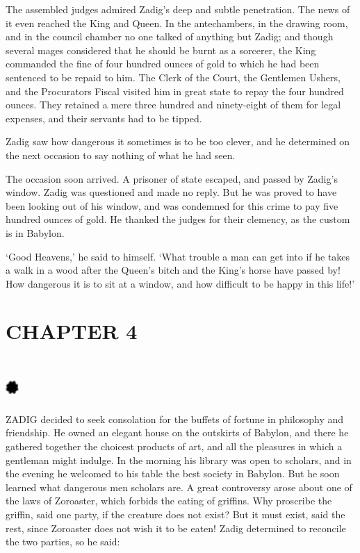 \documentclass{article}
\begin{document}
\begin{center}
The assembled judges admired Zadig's deep and subtle penetration. The news of it 
even reached the King and Queen. In the antechambers, in the drawing room, and 
in the council chamber no one talked of anything but Zadig; and though several 
mages considered that he should be burnt as a sorcerer, the King commanded the 
fine of four hundred ounces of gold to which he had been sentenced to be repaid 
to him. The Clerk of the Court, the Gentlemen Ushers, and the Procurators Fiscal 
visited him in great state to repay the four hundred ounces. They retained a mere 
three hundred and ninety-eight of them for legal expenses, and their servants had 
to be tipped. 

Zadig saw how dangerous it sometimes is to be too clever, and he determined on 
the next occasion to say nothing of what he had seen. 

The occasion soon arrived. A prisoner of state escaped, and passed by Zadig's window. 
Zadig was questioned and made no reply. But he was proved to have been looking 
out of his window, and was condemned for this crime to pay five hundred ounces 
of gold. He thanked the judges for their clemency, as the custom is in Babylon. 

`Good Heavens,' he said to himself. `What trouble a man can get into if he takes 
a walk in a wood after the Queen's bitch and the King's horse have passed by! How 
dangerous it is to sit at a window, and how difficult to be happy in this life!'\pagebreak{} 

\section*{\textbf{CHAPTER 4  }}

\section*{%
\includegraphics[width=14pt, height=15pt, keepaspectratio=true]{Zadig or L'Ingenu - Voltaire-fig007.jpg}
}

 

ZADIG decided to seek consolation for the buffets of fortune in philosophy and 
friendship. He owned an elegant house on the outskirts of Babylon, and there he 
gathered together the choicest products of art, and all the pleasures in which 
a gentleman might indulge. In the morning his library was open to scholars, and 
in the evening he welcomed to his table the best society in Babylon. But he soon 
learned what dangerous men scholars are. A great controversy arose about one of 
the laws of Zoroaster, which forbids the eating of griffins. Why proscribe the 
griffin, said one party, if the creature does not exist? But it must exist, said 
the rest, since Zoroaster does not wish it to be eaten! Zadig determined to reconcile 
the two parties, so he said: 


\end{center}
\end{document}
